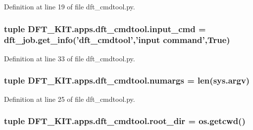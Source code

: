 Definition at line 19 of file dft\+\_\+cmdtool.\+py.

\hypertarget{namespace_d_f_t___k_i_t_1_1apps_1_1dft__cmdtool_aa0e3413d9ae4c07c0b02d807cdc6db8f}{
\subsubsection[{input\+\_\+cmd}]{\setlength{\rightskip}{0pt plus 5cm}tuple D\+F\+T\+\_\+\+K\+I\+T.\+apps.\+dft\+\_\+cmdtool.\+input\+\_\+cmd = dft\+\_\+job.\+get\+\_\+info('dft\+\_\+cmdtool','input command',True)}}\label{namespace_d_f_t___k_i_t_1_1apps_1_1dft__cmdtool_aa0e3413d9ae4c07c0b02d807cdc6db8f}


Definition at line 33 of file dft\+\_\+cmdtool.\+py.

\hypertarget{namespace_d_f_t___k_i_t_1_1apps_1_1dft__cmdtool_ad379ce6f66c010b507abcc8decec82c6}{
\subsubsection[{numargs}]{\setlength{\rightskip}{0pt plus 5cm}tuple D\+F\+T\+\_\+\+K\+I\+T.\+apps.\+dft\+\_\+cmdtool.\+numargs = len(sys.\+argv)}}\label{namespace_d_f_t___k_i_t_1_1apps_1_1dft__cmdtool_ad379ce6f66c010b507abcc8decec82c6}


Definition at line 25 of file dft\+\_\+cmdtool.\+py.

\hypertarget{namespace_d_f_t___k_i_t_1_1apps_1_1dft__cmdtool_ae64fc152ecc9625928d1b894c9509b63}{
\subsubsection[{root\+\_\+dir}]{\setlength{\rightskip}{0pt plus 5cm}tuple D\+F\+T\+\_\+\+K\+I\+T.\+apps.\+dft\+\_\+cmdtool.\+root\+\_\+dir = os.\+getcwd()}}\label{namespace_d_f_t___k_i_t_1_1apps_1_1dft__cmdtool_ae64fc152ecc9625928d1b894c9509b63}


